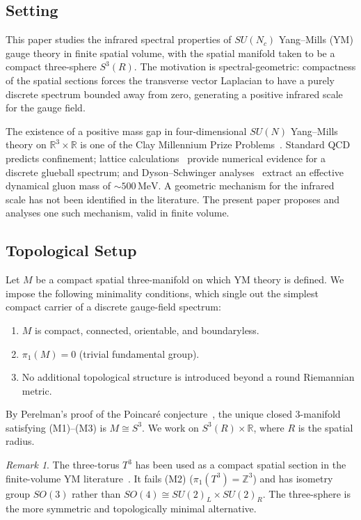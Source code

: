 \documentclass[
  aps,
  prd,
  reprint,
  superscriptaddress,
  nofootinbib,
  longbibliography,
  amsmath,
  amssymb
]{revtex4-2}
\theoremstyle{plain}
\theoremstyle{definition}
\theoremstyle{remark}
\newtheorem{remark}[theorem]{Remark}
\newcommand{\SU}[1]{SU(#1)}
\begin{document}
\subsection{Setting}

This paper studies the infrared spectral properties of $\SU{N_c}$
Yang--Mills (YM) gauge theory in finite spatial volume, with the
spatial manifold taken to be a compact three-sphere $S^3(R)$.
The motivation is spectral-geometric: compactness of the spatial
sections forces the transverse vector Laplacian to have a purely
discrete spectrum bounded away from zero, generating a positive
infrared scale for the gauge field.

The existence of a positive mass gap in four-dimensional $\SU{N}$
Yang--Mills theory on $\mathbb{R}^3\times\mathbb{R}$ is one of the
Clay Millennium Prize Problems~\cite{Jaffe2000}. Standard QCD predicts
confinement; lattice calculations~\cite{Morningstar1999,Chen2006}
provide numerical evidence for a discrete glueball spectrum; and
Dyson--Schwinger analyses~\cite{Cornwall1982,Aguilar2020} extract an
effective dynamical gluon mass of $\sim500\,\mathrm{MeV}$. A
geometric mechanism for the infrared scale has not been identified
in the literature. The present paper proposes and analyses one such
mechanism, valid in finite volume.

\subsection{Topological Setup}

Let $M$ be a compact spatial three-manifold on which YM theory is
defined. We impose the following minimality conditions, which
single out the simplest compact carrier of a discrete gauge-field spectrum:
\begin{enumerate}[label=\textbf{(M\arabic*)},noitemsep]
\item $M$ is compact, connected, orientable, and boundaryless.
\item $\pi_1(M)=0$ (trivial fundamental group).
\item No additional topological structure is introduced beyond a
  round Riemannian metric.
\end{enumerate}
By Perelman's proof of the Poincar\'e
conjecture~\cite{Perelman2002,Perelman2003a,Perelman2003b}, the
unique closed 3-manifold satisfying (M1)--(M3) is $M\cong S^3$.
We work on $S^3(R)\times\mathbb{R}$, where $R$ is the spatial radius.

\begin{remark}
  The three-torus $T^3$ has been used as a compact spatial section
  in the finite-volume YM literature~\cite{Luscher1983}. It fails
  (M2) ($\pi_1(T^3)=\mathbb{Z}^3$) and has isometry group $SO(3)$
  rather than $SO(4)\cong SU(2)_L\times SU(2)_R$. The three-sphere
  is the more symmetric and topologically minimal alternative.
\end{remark}
\end{document}

